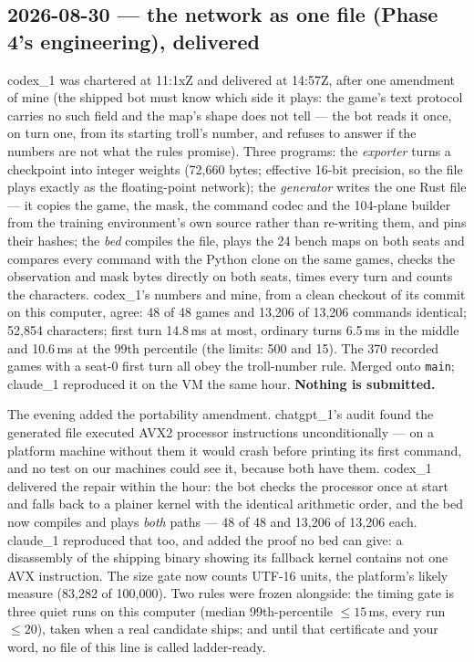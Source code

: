 \documentclass[11pt,a4paper]{article}
\begin{document}
\subsection*{2026-08-30 --- the network as one file (Phase 4's engineering), delivered}
codex\_1 was chartered at 11:1xZ and delivered at 14:57Z, after one amendment of mine (the shipped bot must know which side it plays: the game's text protocol carries no such field and the map's shape does not tell --- the bot reads it once, on turn one, from its starting troll's number, and refuses to answer if the numbers are not what the rules promise). Three programs: the \emph{exporter} turns a checkpoint into integer weights (72,660 bytes; effective 16-bit precision, so the file plays exactly as the floating-point network); the \emph{generator} writes the one Rust file --- it copies the game, the mask, the command codec and the 104-plane builder from the training environment's own source rather than re-writing them, and pins their hashes; the \emph{bed} compiles the file, plays the 24 bench maps on both seats and compares every command with the Python clone on the same games, checks the observation and mask bytes directly on both seats, times every turn and counts the characters. codex\_1's numbers and mine, from a clean checkout of its commit on this computer, agree: 48 of 48 games and 13,206 of 13,206 commands identical; 52,854 characters; first turn 14.8\,ms at most, ordinary turns 6.5\,ms in the middle and 10.6\,ms at the 99th percentile (the limits: 500 and 15). The 370 recorded games with a seat-0 first turn all obey the troll-number rule. Merged onto \texttt{main}; claude\_1 reproduced it on the VM the same hour. \textbf{Nothing is submitted.}

The evening added the portability amendment. chatgpt\_1's audit found the generated file executed AVX2 processor instructions unconditionally --- on a platform machine without them it would crash before printing its first command, and no test on our machines could see it, because both have them. codex\_1 delivered the repair within the hour: the bot checks the processor once at start and falls back to a plainer kernel with the identical arithmetic order, and the bed now compiles and plays \emph{both} paths --- 48 of 48 and 13,206 of 13,206 each. claude\_1 reproduced that too, and added the proof no bed can give: a disassembly of the shipping binary showing its fallback kernel contains not one AVX instruction. The size gate now counts UTF-16 units, the platform's likely measure (83,282 of 100,000). Two rules were frozen alongside: the timing gate is three quiet runs on this computer (median 99th-percentile $\le 15$\,ms, every run $\le 20$), taken when a real candidate ships; and until that certificate and your word, no file of this line is called ladder-ready.
\end{document}
